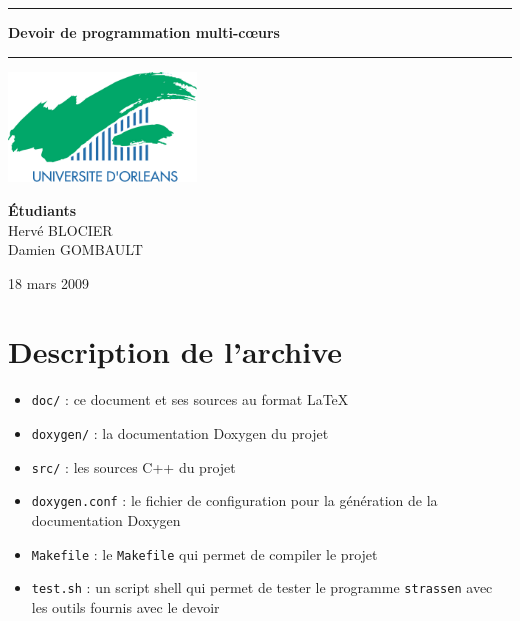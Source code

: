 \documentclass[a4paper, 12pt]{article}
\begin{document}
\thispagestyle{empty}

\begin{center}
\vspace*{\fill}

\hrule
\vspace{1cm}
{\Huge \textbf{Devoir de programmation multi-cœurs}\\}
\vspace{1cm}
\hrule

\vspace{2cm}
\includegraphics[width=5cm]{includes/png/logo-univ.png}
\vspace{2cm}

{\Large
\textbf{Étudiants} \\
Hervé BLOCIER \\
Damien GOMBAULT \\
}

\vspace{4cm}

\large{18 mars 2009\\}

\vspace*{\fill}
\end{center}

\newpage

\renewcommand{\contentsname}{Sommaire}
\setcounter{tocdepth}{2}
\tableofcontents
\newpage

\section{Description de l'archive}

\begin{itemize}
\item \texttt{doc/} : ce document et ses sources au format
  {\LaTeX}
\item \texttt{doxygen/} : la documentation Doxygen du projet
\item \texttt{src/} : les sources C++ du projet
\item \texttt{doxygen.conf} : le fichier de configuration pour la
  génération de la documentation Doxygen
\item \texttt{Makefile} : le \texttt{Makefile} qui permet de compiler
  le projet
\item \texttt{test.sh} : un script shell qui permet de tester le
  programme \texttt{strassen} avec les outils fournis avec le devoir
\end{itemize}
\end{document}
